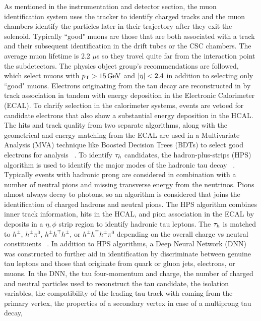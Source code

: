 As mentioned in the instrumentation and detector section, the muon identification system uses the tracker to identify charged tracks and the muon chambers identify the particles later in their trajectory after they exit the solenoid. Typically ``good" muons are those that are both associated with a track and their subsequent identification in the drift tubes or the CSC chambers. The average muon lifetime is 2.2 $\mu$s so they travel quite far from the interaction point the subdetectors.  The physics object group's recommendations are followed, which select muons with $p_{\mathrm{T}}>15\,\text{Ge\hspace{-.08em}V}$ and $\lvert \eta \rvert<2.4$ in addition to selecting only ``good" muons.
Electrons originating from the tau decay are reconstructed in by track association in tandem with energy deposition in the Electronic Calorimeter (ECAL). To clarify selection in the calorimeter systems, events are vetoed for candidate electrons that also show a substantial energy deposition in the HCAL. The hits and track quality from two separate algorithms, along with the geometrical and energy matching from the ECAL are used in a Multivariate Analysis (MVA) technique like Boosted Decision Trees (BDTs) to select good electrons for analysis 
~\cite{Khachatryan:2015hwa}.
To identify $\tau_h$ candidates, the hadron-plus-strips (HPS) algorithm is used to identify the major modes of the hadronic tau decay ~\cite{Sirunyan_2018}. Typically events with hadronic prong are considered in combination with a number of neutral pions and missing transverse energy from the neutrinos. Pions almost always decay to photons, so an algorithm is considered that joins the identification of charged hadrons and neutral pions. 
The HPS algorithm combines inner track information, hits in the HCAL, and pion association in the ECAL by deposits in a $\eta,\phi$ strip region to identify hadronic tau leptons. 
The $\tau_h$ is matched to $h^{\pm}$, $h^{\pm}\pi^{0}$, $h^{\pm}h^{\mp}h^{\pm}$, or $h^{\pm}h^{\mp}h^{\pm}\pi^{0}$ depending on the overall charge vs neutral constituents ~\cite{Sirunyan:2018pgf,Hassanshahi:2797703}.
In addition to HPS algorithms, a Deep Neural Network (DNN) was constructed to further aid in identification by discriminate between genuine tau leptons and those that originate from quark or gluon jets, electrons, or muons.  
In the DNN, the tau four-momentum and charge,
the number of charged and neutral particles used to reconstruct the tau candidate,
the isolation variables,
the compatibility of the leading tau track with coming from the primary vertex,
the properties of a secondary vertex in case of a multiprong tau decay,

